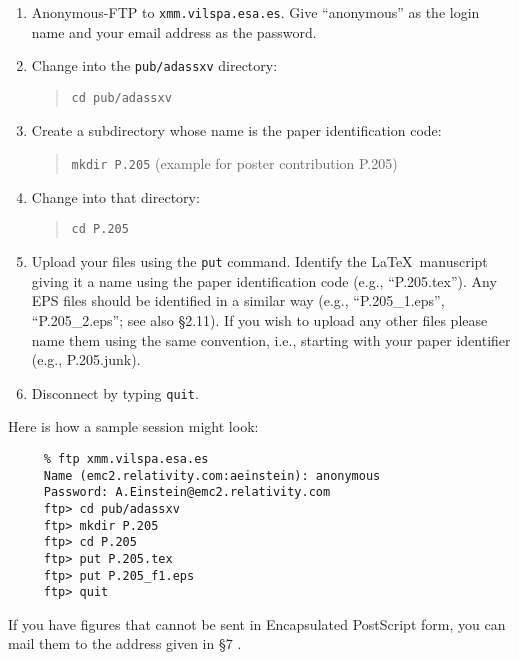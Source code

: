 \documentclass[11pt,twoside]{article}
\begin{document}
\begin{enumerate}

\item Anonymous-FTP to \verb;xmm.vilspa.esa.es;.  Give
``anonymous'' as the login name and your email address as the password.

\item Change into the \verb+pub/adassxv+ directory:
\begin{quote}
\verb;cd pub/adassxv;
\end{quote}

\item Create a subdirectory whose name is the paper identification code:
\begin{quote}
\verb;mkdir P.205; (example for poster contribution P.205) 
\end{quote}

\item Change into that directory:
\begin{quote}
\verb;cd P.205; 
\end{quote}

\item Upload your files using the \quad\verb;put; command.  Identify the
\LaTeX\ manuscript giving it a name using the paper identification code
(e.g., ``P.205.tex'').  Any EPS files should be identified in a similar way
(e.g., ``P.205\_1.eps'', ``P.205\_2.eps''; see also \S 2.11). 
If you wish to upload any other files please name them
using the same convention, i.e., starting with your paper identifier
(e.g., P.205.junk).

\item Disconnect by typing \quad\verb;quit;.
\end{enumerate}

Here is how a sample session might look:
\begin{verbatim}
     % ftp xmm.vilspa.esa.es
     Name (emc2.relativity.com:aeinstein): anonymous  
     Password: A.Einstein@emc2.relativity.com
     ftp> cd pub/adassxv
     ftp> mkdir P.205
     ftp> cd P.205
     ftp> put P.205.tex
     ftp> put P.205_f1.eps
     ftp> quit
\end{verbatim}

If you have figures that cannot be sent in Encapsulated PostScript form, you can
mail them to the address given in 
\S 7
.  
\end{document}

